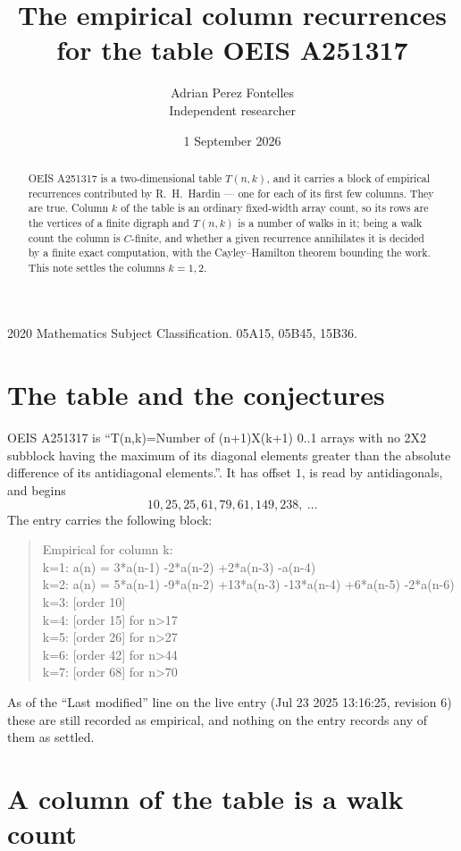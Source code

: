 \documentclass[11pt,a4paper]{article}
\title{The empirical column recurrences for the table OEIS A251317}
\author{Adrian Perez Fontelles\\ \small Independent researcher}
\date{1 September 2026}
\theoremstyle{plain}
\theoremstyle{definition}
\begin{document}
\maketitle

\begin{abstract}
OEIS A251317 is a two-dimensional table $T(n,k)$, and it carries a block of empirical
recurrences contributed by R.~H.~Hardin --- one for each of its first few columns. They are
true. Column $k$ of the table is an ordinary fixed-width array count, so its rows are the
vertices of a finite digraph and $T(n,k)$ is a number of walks in it; being a walk count the
column is $C$-finite, and whether a given recurrence annihilates it is decided by a finite
exact computation, with the Cayley--Hamilton theorem bounding the work. This note settles the
columns $k=1, 2$.
\end{abstract}

\noindent\small 2020 Mathematics Subject Classification. 05A15, 05B45, 15B36.\normalsize

\section{The table and the conjectures}

OEIS A251317 is ``T(n,k)=Number of (n+1)X(k+1) 0..1 arrays with no 2X2 subblock having the maximum of its diagonal elements greater than the absolute difference of its antidiagonal elements.''. It has offset $1$, is
read by antidiagonals, and begins
\[
10, 25, 25, 61, 79, 61, 149, 238,\ \dots
\]
The entry carries the following block:
\begin{quote}\small
Empirical for column k:\\
k=1: a(n) = 3*a(n-1) -2*a(n-2) +2*a(n-3) -a(n-4)\\
k=2: a(n) = 5*a(n-1) -9*a(n-2) +13*a(n-3) -13*a(n-4) +6*a(n-5) -2*a(n-6)\\
k=3: [order 10]\\
k=4: [order 15] for n>17\\
k=5: [order 26] for n>27\\
k=6: [order 42] for n>44\\
k=7: [order 68] for n>70\\
\end{quote}
As of the ``Last modified'' line on the live entry (Jul 23 2025 13:16:25, revision 6) these are still
recorded as empirical, and nothing on the entry records any of them as settled.

\section{A column of the table is a walk count}
\end{document}
